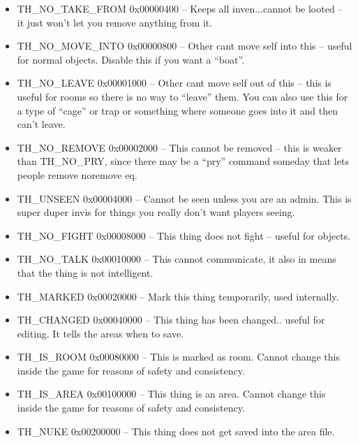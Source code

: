 \begin{itemize}
\item TH\_NO\_TAKE\_FROM     0x00000400   -- Keeps all inven...cannot be looted -- it just won't let you remove anything from it.

\item TH\_NO\_MOVE\_INTO     0x00000800   -- Other cant move self into this -- useful for normal objects. Disable this if you want a ``boat''.

\item TH\_NO\_LEAVE         0x00001000   -- Other cant move self out of this -- this is useful for rooms so there is no way to ``leave'' them. You can also use this for a type of ``cage'' or trap or something where someone goes into it and then can't leave.

\item TH\_NO\_REMOVE        0x00002000   -- This cannot be removed -- this is weaker than TH\_NO\_PRY, since there may be a ``pry'' command someday that lets people remove noremove eq.

\item TH\_UNSEEN           0x00004000   -- Cannot be seen unless you are an admin. This is super duper invis for things you really don't want players seeing.

\item TH\_NO\_FIGHT         0x00008000   -- This thing does not fight -- useful for objects.

\item TH\_NO\_TALK          0x00010000    -- This cannot communicate, it also in means that the thing is not intelligent.

\item TH\_MARKED           0x00020000   -- Mark this thing temporarily, used internally.

\item TH\_CHANGED          0x00040000   -- This thing has been changed.. useful
  for editing. It tells the areas when to save.

\item TH\_IS\_ROOM          0x00080000   -- This is marked as room. Cannot
  change this inside the game for reasons of safety and consistency.

\item TH\_IS\_AREA          0x00100000   -- This thing is an area. Cannot change  this inside the game for reasons of safety and consistency.

\item TH\_NUKE             0x00200000   -- This thing does not get saved into the area file.


\end{itemize}
